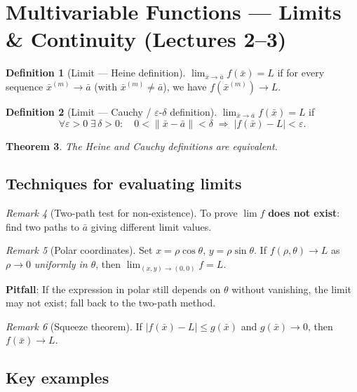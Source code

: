\documentclass[12pt,a4paper]{article}
\newtheorem{theorem}{Theorem}[section]
\theoremstyle{definition}
\newtheorem{definition}[theorem]{Definition}
\theoremstyle{remark}
\newtheorem{remark}[theorem]{Remark}
\newcommand{\xbar}{\bar{x}}
\newcommand{\abar}{\bar{a}}
\begin{document}
\section{Multivariable Functions --- Limits \& Continuity (Lectures 2--3)}

\begin{definition}[Limit --- Heine definition]
$\displaystyle\lim_{\xbar\to\abar}f(\xbar)=L$ if for every sequence
$\xbar^{(m)}\to\abar$ (with $\xbar^{(m)}\ne\abar$), we have $f(\xbar^{(m)})\to L$.
\end{definition}

\begin{definition}[Limit --- Cauchy / $\varepsilon$-$\delta$ definition]
$\displaystyle\lim_{\xbar\to\abar}f(\xbar)=L$ if
\[
  \forall\varepsilon>0\;\exists\,\delta>0:\quad 0<\|\xbar-\abar\|<\delta\;\Longrightarrow\;|f(\xbar)-L|<\varepsilon.
\]
\end{definition}

\begin{theorem}
The Heine and Cauchy definitions are equivalent.
\end{theorem}

\subsection*{Techniques for evaluating limits}

\begin{remark}[Two-path test for non-existence]
To prove $\lim f$ \textbf{does not exist}: find two paths to $\abar$ giving different limit values.
\end{remark}

\begin{remark}[Polar coordinates]
Set $x=\rho\cos\theta$, $y=\rho\sin\theta$.  If $f(\rho,\theta)\to L$ as $\rho\to 0$ \emph{uniformly in $\theta$}, then $\lim_{(x,y)\to(0,0)}f=L$.

\textbf{Pitfall}: If the expression in polar still depends on $\theta$ without vanishing, the limit may not exist; fall back to the two-path method.
\end{remark}

\begin{remark}[Squeeze theorem]
If $|f(\xbar)-L|\le g(\xbar)$ and $g(\xbar)\to 0$, then $f(\xbar)\to L$.
\end{remark}

\subsection*{Key examples}
\end{document}
